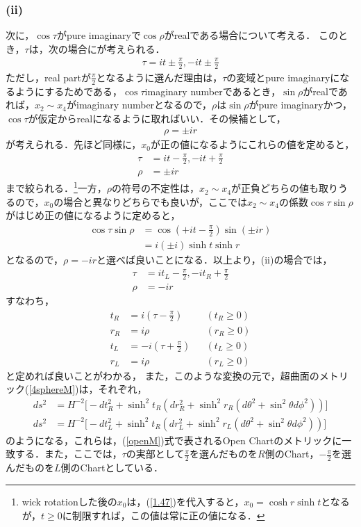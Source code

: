 \subsubsection{(ii)}
次に，$\cos\tau$がpure imaginaryで$\cos\rho$がrealである場合について考える．
このとき，$\tau$は，次の場合にが考えられる．
\begin{align}
  \tau=it\pm\frac{\pi}{2},-it\pm\frac{\pi}{2}
\end{align}
ただし，real partが$\frac{\pi}{2}$となるように選んだ理由は，$\tau$の変域とpure imaginaryになるようにするためである，$\cos\tau$imaginary numberであるとき，$\sin\rho$がrealであれば，$x_2 \sim x_4$がimaginary numberとなるので，$\rho$は$\sin\rho$がpure imaginaryかつ，$\cos\tau$が仮定からrealになるように取ればいい．その候補として，
\begin{align}
  \rho=\pm ir
\end{align}
が考えられる．先ほど同様に，$x_0$が正の値になるようにこれらの値を定めると，
\begin{align}
  \label{1.47}
  \tau&=it-\frac{\pi}{2},-it+\frac{\pi}{2} \\
  \label{1.48}
  \rho &= \pm ir
\end{align}
まで絞られる．\footnote{wick rotationした後の$x_0$は，(\ref{1.47})を代入すると，$x_0=\cosh{r}\sinh{t}$となるが，$t \geqslant 0$に制限すれば，この値は常に正の値になる．}一方，$\rho$の符号の不定性は，$x_2\sim x_4$が正負どちらの値も取りうるので，$x_0$の場合と異なりどちらでも良いが，ここでは$x_2\sim x_4$の係数$\cos\tau\sin\rho$がはじめ正の値になるように定めると，
\begin{align}
  \cos\tau\sin\rho&=\cos(+it-\frac{\pi}{2})\sin(\pm ir) \\
  &=i(\pm i)\sinh{t}\sinh{r}
\end{align}
となるので，$\rho=-ir$と選べば良いことになる．以上より，(ii)の場合では，
\begin{align}
  \label{1.49}
  \tau&=it_{L}-\frac{\pi}{2},-it_{R}+\frac{\pi}{2} \\
  \label{1.59}
  \rho&=-ir
\end{align}
すなわち，
\begin{align}
  t_{R}&=i(\tau-\frac{\pi}{2})& &(t_{R} \geqslant 0) \\
  r_{R}&=i\rho& &(r_{R} \geqslant 0) \\
  t_{L}&=-i(\tau+\frac{\pi}{2})& &(t_{L} \geqslant 0) \\
  r_{L}&=i\rho& &(r_{L} \geqslant 0)
\end{align}
と定めれば良いことがわかる，
また，このような変換の元で，超曲面のメトリック(\ref{4sphereM})は，それぞれ，
\begin{align}
  ds^2&=H^{-2}\biggr[-dt_{R}^2+\sinh^2{t_{R}}(dr_{R}^2+\sinh^2r_{R}(d\theta^2+\sin^2\theta d\phi^2))\biggr] \\
ds^2&=H^{-2}\biggr[-dt_{L}^2+\sinh^2{t_{R}}(dr_{L}^2+\sinh^2r_{L}(d\theta^2+\sin^2\theta d\phi^2))\biggr]
\end{align}
のようになる，これらは，(\ref{openM})式で表されるOpen Chartのメトリックに一致する．また，ここでは，$\tau$の実部として$\frac{\pi}{2}$を選んだものを$R$側のChart，$-\frac{\pi}{2}$を選んだものを$L$側のChartとしている．

